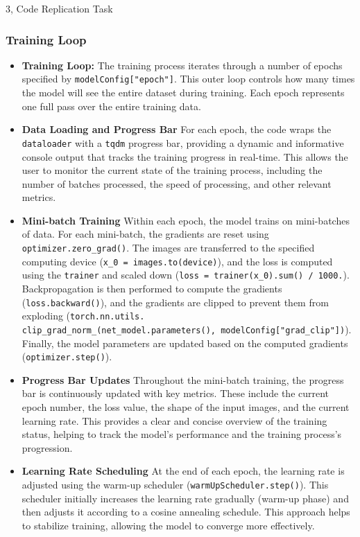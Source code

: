 \documentclass[10pt,a4paper]{article}
\begin{document}
\begin{task}{3, Code Replication Task}
\subsubsection{Training Loop}

\begin{itemize}
    \item \textbf{Training Loop:}
The training process iterates through a number of epochs specified by \texttt{modelConfig["epoch"]}. This outer loop controls how many times the model will see the entire dataset during training. Each epoch represents one full pass over the entire training data.

\item \textbf{Data Loading and Progress Bar}
For each epoch, the code wraps the \texttt{dataloader} with a \texttt{tqdm} progress bar, providing a dynamic and informative console output that tracks the training progress in real-time. This allows the user to monitor the current state of the training process, including the number of batches processed, the speed of processing, and other relevant metrics.

\item \textbf{Mini-batch Training}
Within each epoch, the model trains on mini-batches of data. For each mini-batch, the gradients are reset using \texttt{optimizer.zero\_grad()}. The images are transferred to the specified computing device (\texttt{x\_0 = images.to(device)}), and the loss is computed using the \texttt{trainer} and scaled down (\texttt{loss = trainer(x\_0).sum() / 1000.}). Backpropagation is then performed to compute the gradients (\texttt{loss.backward()}), and the gradients are clipped to prevent them from exploding (\texttt{torch.nn.utils.\\clip\_grad\_norm\_(net\_model.parameters(), modelConfig["grad\_clip"])}). Finally, the model parameters are updated based on the computed gradients (\texttt{optimizer.step()}).

\item \textbf{Progress Bar Updates}
Throughout the mini-batch training, the progress bar is continuously updated with key metrics. These include the current epoch number, the loss value, the shape of the input images, and the current learning rate. This provides a clear and concise overview of the training status, helping to track the model's performance and the training process's progression.

\item \textbf{Learning Rate Scheduling}
At the end of each epoch, the learning rate is adjusted using the warm-up scheduler (\texttt{warmUpScheduler.step()}). This scheduler initially increases the learning rate gradually (warm-up phase) and then adjusts it according to a cosine annealing schedule. This approach helps to stabilize training, allowing the model to converge more effectively.


\end{itemize}
\end{task}
\end{document}
